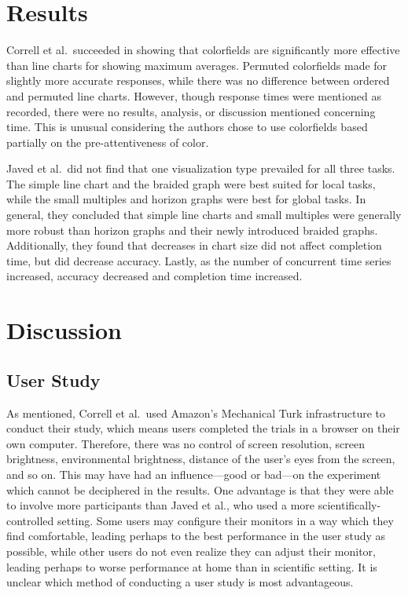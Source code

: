 \documentclass{article} %
\begin{document}
\section{Results}

Correll et al.\ succeeded in showing that colorfields are significantly more effective than line charts for showing maximum averages.  Permuted colorfields made for slightly more accurate responses, while there was no difference between ordered and permuted line charts.  However, though response times were mentioned as recorded, there were no results, analysis, or discussion mentioned concerning time.  This is unusual considering the authors chose to use colorfields based partially on the pre-attentiveness of color.

Javed et al.\ did not find that one visualization type prevailed for all three tasks.  The simple line chart and the braided graph were best suited for local tasks, while the small multiples and horizon graphs were best for global tasks.  In general, they concluded that simple line charts and small multiples were generally more robust than horizon graphs and their newly introduced braided graphs. Additionally, they found that decreases in chart size did not affect completion time, but did decrease accuracy.  Lastly, as the number of concurrent time series increased, accuracy decreased and completion time increased. 

\section{Discussion}

\subsection{User Study}

As mentioned, Correll et al.\ used Amazon's Mechanical Turk infrastructure to conduct their study, which means users completed the trials in a browser on their own computer.  Therefore, there was no control of screen resolution, screen brightness, environmental brightness, distance of the user's eyes from the screen, and so on.  This may have had an influence---good or bad---on the experiment which cannot be deciphered in the results.  One advantage is that they were able to involve more participants than Javed et al., who used a more scientifically-controlled setting.  Some users may configure their monitors in a way which they find comfortable, leading perhaps to the best performance in the user study as possible, while other users do not even realize they can adjust their monitor, leading perhaps to worse performance at home than in scientific setting.  It is unclear which method of conducting a user study is most advantageous.
\end{document}
